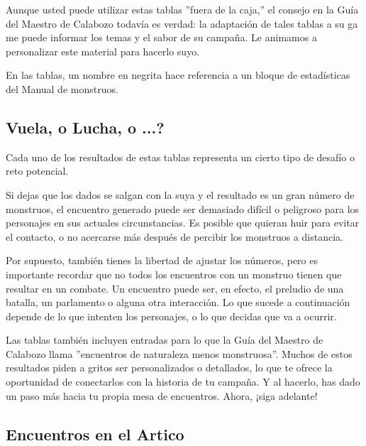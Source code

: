 \documentclass[a4paper,twocolumn,openany,10pt]{dndbook}
\begin{document}
Aunque usted puede utilizar estas tablas ''fuera de la caja,'' el consejo en la Guía del Maestro de Calabozo todavía es verdad: la
adaptación de tales tablas a su ga me puede informar los temas y el sabor de su campaña. Le animamos a personalizar este material
para hacerlo suyo.

En las tablas, un nombre en negrita hace referencia a un bloque de estadísticas del Manual de monstruos. 

\subsection*{Vuela, o Lucha, o ...?}
Cada uno de los resultados de estas tablas representa un cierto tipo de desafío o reto potencial.

Si dejas que los dados se salgan con la suya y el resultado es un gran número de monstruos, el encuentro generado puede ser
demasiado difícil o peligroso para los personajes en sus actuales circunstancias. Es posible que quieran huir para evitar el
contacto, o no acercarse más después de percibir los monstruos a distancia.

Por supuesto, también tienes la libertad de ajustar los números, pero es importante recordar que no todos los encuentros con un
monstruo tienen que resultar en un combate. Un encuentro puede ser, en efecto, el preludio de una batalla, un parlamento o alguna
otra interacción. Lo que sucede a continuación depende de lo que intenten los personajes, o lo que decidas que va a ocurrir.

Las tablas también incluyen entradas para lo que la Guía del Maestro de Calabozo llama ''encuentros de naturaleza menos
monstruosa''. Muchos de estos resultados piden a gritos ser personalizados o detallados, lo que te ofrece la oportunidad de
conectarlos con la historia de tu campaña. Y al hacerlo, has dado un paso más hacia tu propia mesa de encuentros. Ahora, ¡siga
adelante! 

\newpage
\subsection{Encuentros en el Artico}
\end{document}
